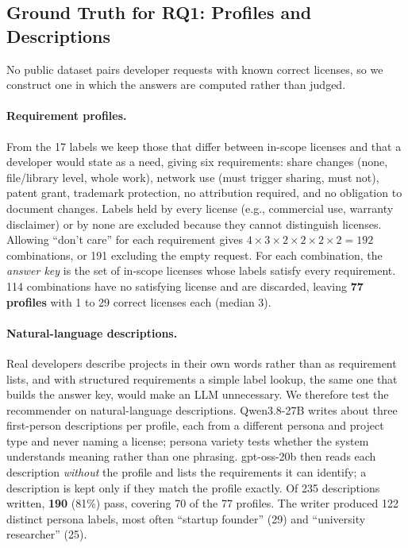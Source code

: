 \subsection{Ground Truth for RQ1: Profiles and Descriptions}
\label{ss:gt1}

No public dataset pairs developer requests with known correct licenses, so we construct one in which the answers are computed rather than judged.

\paragraph{Requirement profiles.} From the 17 labels we keep those that differ between in-scope licenses and that a developer would state as a need, giving six requirements: share changes (none, file/library level, whole work), network use (must trigger sharing, must not), patent grant, trademark protection, no attribution required, and no obligation to document changes. Labels held by every license (e.g., commercial use, warranty disclaimer) or by none are excluded because they cannot distinguish licenses. Allowing ``don't care'' for each requirement gives $4 \times 3 \times 2 \times 2 \times 2 \times 2 = 192$ combinations, or 191 excluding the empty request. For each combination, the \emph{answer key} is the set of in-scope licenses whose labels satisfy every requirement. 114 combinations have no satisfying license and are discarded, leaving \textbf{77 profiles} with 1 to 29 correct licenses each (median 3).

\paragraph{Natural-language descriptions.} Real developers describe projects in their own words rather than as requirement lists, and with structured requirements a simple label lookup, the same one that builds the answer key, would make an LLM unnecessary. We therefore test the recommender on natural-language descriptions. Qwen3.8-27B writes about three first-person descriptions per profile, each from a different persona and project type and never naming a license; persona variety tests whether the system understands meaning rather than one phrasing. gpt-oss-20b then reads each description \emph{without} the profile and lists the requirements it can identify; a description is kept only if they match the profile exactly. Of 235 descriptions written, \textbf{190} (81\%) pass, covering 70 of the 77 profiles. The writer produced 122 distinct persona labels, most often ``startup founder'' (29) and ``university researcher'' (25).


